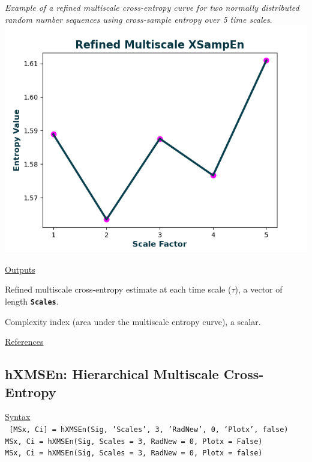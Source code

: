 \documentclass[12pt, a4paper, titlepage, openany]{book}
\begin{document}
\begin{description}[labelsep=1cm, labelwidth=2cm, nosep, style=multiline,leftmargin=3cm]
\textit{Example of a refined multiscale cross-entropy curve for two normally distributed random number sequences using cross-sample entropy over 5 time scales}.\\
							\includegraphics[scale=.7]{rXMSEn1.png}\end{description}

\noindent \ul{Outputs}
\begin{description}[labelsep=1cm, labelwidth=2cm, nosep, style=multiline,leftmargin=3cm]\footnotesize
\item[\texttt{MSx}]		Refined multiscale cross-entropy estimate at each time scale ($\tau$), a vector of length 											\textbf{\texttt{Scales}}.
\item[\texttt{Ci}]		Complexity index (area under the multiscale entropy curve), a scalar.
\end{description}

\noindent \ul{References}\hspace{1cm}
\cite{MS1} \cite{XMS1} \cite{rMS1}  



\newpage
\subsection{\normalsize hXMSEn: \hspace{15mm} Hierarchical Multiscale Cross-Entropy}
\noindent\ul{Syntax} \vspace{6mm} \\ \noindent \texttt{\footnotesize
[MSx, Ci] = hXMSEn(Sig, 'Scales', 3, 'RadNew', 0, ‘Plotx’, false)\\
MSx, Ci = hXMSEn(Sig, Scales = 3, RadNew = 0, Plotx = False)\\ 
MSx, Ci = hXMSEn(Sig, Scales = 3, RadNew = 0, Plotx = false)}
\end{document}
